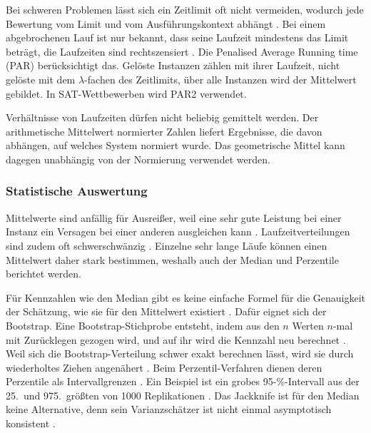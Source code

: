 Bei schweren Problemen lässt sich ein Zeitlimit oft nicht vermeiden, wodurch jede Bewertung vom Limit und vom Ausführungskontext abhängt . Bei einem abgebrochenen Lauf ist nur bekannt, dass seine Laufzeit mindestens das Limit beträgt, die Laufzeiten sind rechtszensiert . Die Penalised Average Running time (PAR) berücksichtigt das. Gelöste Instanzen zählen mit ihrer Laufzeit, nicht gelöste mit dem $\lambda$-fachen des Zeitlimits, über alle Instanzen wird der Mittelwert gebildet. In SAT-Wettbewerben wird PAR2 verwendet. 

Verhältnisse von Laufzeiten dürfen nicht beliebig gemittelt werden. Der arithmetische Mittelwert normierter Zahlen liefert Ergebnisse, die davon abhängen, auf welches System normiert wurde. Das geometrische Mittel kann dagegen unabhängig von der Normierung verwendet werden. 

\subsubsection{Statistische Auswertung}\label{sec:statistik}
Mittelwerte sind anfällig für Ausreißer, weil eine sehr gute Leistung bei einer Instanz ein Versagen bei einer anderen ausgleichen kann . Laufzeitverteilungen sind zudem oft schwerschwänzig . Einzelne sehr lange Läufe können einen Mittelwert daher stark bestimmen, weshalb auch der Median und Perzentile berichtet werden.

Für Kennzahlen wie den Median gibt es keine einfache Formel für die Genauigkeit der Schätzung, wie sie für den Mittelwert existiert . Dafür eignet sich der Bootstrap. Eine Bootstrap-Stichprobe entsteht, indem aus den $n$ Werten $n$-mal mit Zurücklegen gezogen wird, und auf ihr wird die Kennzahl neu berechnet . Weil sich die Bootstrap-Verteilung schwer exakt berechnen lässt, wird sie durch wiederholtes Ziehen angenähert . Beim Perzentil-Verfahren dienen deren Perzentile als Intervallgrenzen . Ein Beispiel ist ein grobes 95-\%-Intervall aus der 25.\ und 975.\ größten von 1000 Replikationen . Das Jackknife ist für den Median keine Alternative, denn sein Varianzschätzer ist nicht einmal asymptotisch konsistent .

